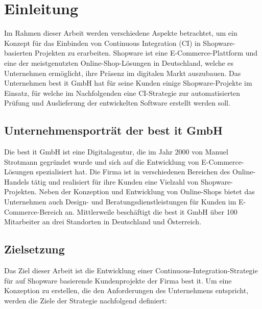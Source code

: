 
\section{Einleitung} \label{sec:01-introduction}

Im Rahmen dieser Arbeit werden verschiedene Aspekte betrachtet, um ein Konzept für das Einbinden von
Continuous Integration (CI) in Shopware-basierten Projekten zu erarbeiten.
Shopware ist eine E-Commerce-Plattform und eine der meistgenutzten Online-Shop-Lösungen in
Deutschland, welche es Unternehmen ermöglicht, ihre Präsenz im digitalen Markt
auszubauen.
Das Unternehmen best it GmbH hat für seine Kunden einige Shopware-Projekte im Einsatz, für welche im Nachfolgenden
eine CI-Strategie zur automatisierten Prüfung und Auslieferung der entwickelten Software erstellt werden soll.

\subsection{Unternehmensporträt der best it GmbH} \label{subsec:01-introduction-1}

Die best it GmbH ist eine Digitalagentur, die im Jahr 2000 von Manuel Strotmann gegründet wurde und sich auf die
Entwicklung von E-Commerce-Lösungen spezialisiert hat.
Die Firma ist in verschiedenen Bereichen des Online-Handels tätig und realisiert für ihre Kunden eine Vielzahl von
Shopware-Projekten.
Neben der Konzeption und Entwicklung von Online-Shops bietet das Unternehmen auch Design- und
Beratungsdienstleistungen für Kunden im E-Commerce-Bereich an.
Mittlerweile beschäftigt die best it GmbH über 100 Mitarbeiter an drei Standorten in Deutschland und Österreich.

\subsection{Zielsetzung} \label{subsec:01-introduction-2}

Das Ziel dieser Arbeit ist die Entwicklung einer Continuous-Integration-Strategie für auf Shopware basierende
Kundenprojekte der Firma best it.
Um eine Konzeption zu erstellen, die den Anforderungen des Unternehmens entspricht, werden die Ziele der Strategie
nachfolgend definiert:

